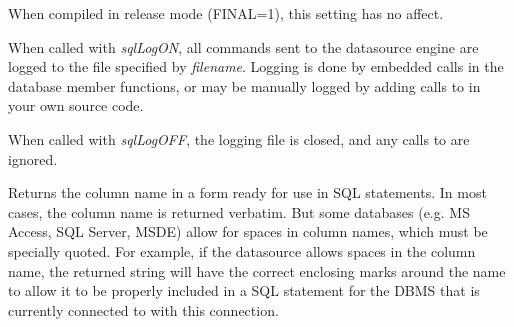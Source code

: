 When compiled in release mode (FINAL=1), this setting has no affect.



\label{wxdbsetsqllogging}





When called with {\it sqlLogON}, all commands sent to the datasource engine are logged to the file specified by {\it filename}.  Logging is done by embedded  calls in the database member functions, or may be manually logged by adding calls to  in your own source code.

When called with {\it sqlLogOFF}, the logging file is closed, and any calls to  are ignored.

\label{wxdbsqlcolumnname}


Returns the column name in a form ready for use in SQL statements.
In most cases, the column name is returned verbatim.  But some databases
(e.g. MS Access, SQL Server, MSDE) allow for spaces in column names, which
must be specially quoted.  For example, if the datasource allows spaces
in the column name, the returned string will have the correct enclosing
marks around the name to allow it to be properly included in a SQL statement
for the DBMS that is currently connected to with this connection.



